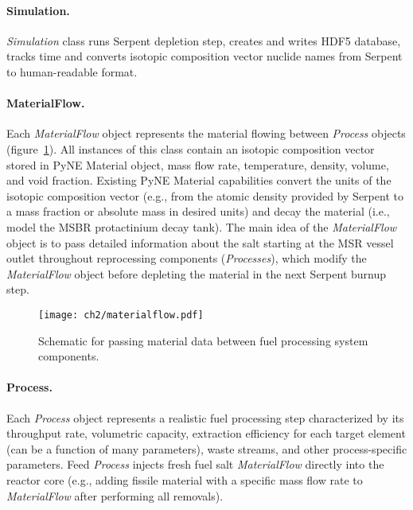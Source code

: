 \paragraph{Simulation.}\textit{Simulation} class runs Serpent depletion step, 
creates and writes HDF5 database, tracks time and converts isotopic 
composition vector nuclide names from Serpent to human-readable format.
\paragraph{MaterialFlow.}Each \textit{MaterialFlow} object represents the 
material flowing between \textit{Process} objects  
(figure~\ref{fig:matflow_obj}). All instances of this class 
contain an isotopic composition vector stored in PyNE Material object, mass 
flow rate, temperature, density, volume, and void fraction. Existing PyNE 
Material capabilities convert the units of the isotopic composition vector 
(e.g., from the atomic density provided by Serpent to a mass fraction or 
absolute mass in desired units) and decay the material (i.e., model the 
\gls{MSBR} protactinium decay tank). The main idea of the 
\textit{MaterialFlow} object is to pass detailed information about the salt 
starting at the \gls{MSR} vessel outlet throughout reprocessing components 
(\textit{Processes}), which modify the \textit{MaterialFlow} object before 
depleting the material in the next Serpent burnup step. 
\begin{figure}[ht!] %
	\centering
	\texttt{[image: ch2/materialflow.pdf]}
	\vspace{-0.1in}
	\caption{Schematic for passing material data between fuel processing 
		system components.}
	\label{fig:matflow_obj}
\end{figure}
\paragraph{Process.}Each \textit{Process} object represents a 
realistic fuel processing step characterized by its throughput rate, 
volumetric capacity, extraction efficiency for each target element (can be 
a function of many parameters), waste streams, and other process-specific 
parameters. Feed \textit{Process} injects fresh fuel salt 
\textit{MaterialFlow} directly into the reactor core (e.g., adding fissile 
material with a specific mass flow rate to \textit{MaterialFlow} after 
performing all removals).\\


